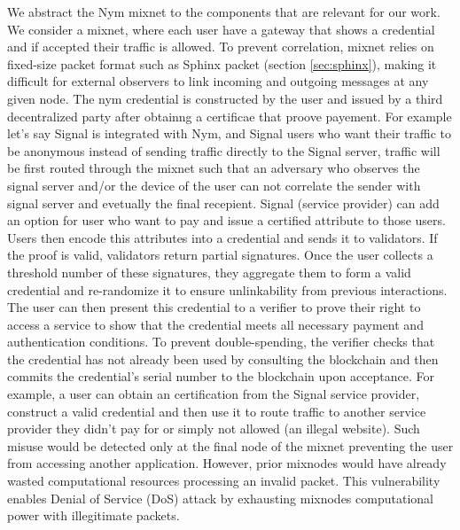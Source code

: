 %
%
We abstract the Nym mixnet to the components that are relevant for our
work. We consider a mixnet, where each user have a gateway that shows a
credential and if accepted their traffic is allowed.  To prevent
correlation, mixnet relies on fixed-size packet format such as Sphinx
packet (section \ref{sec:sphinx}), making it difficult for external
observers to link incoming and outgoing messages at any given node.  The
nym credential is constructed by the user and issued by a third
decentralized party after obtainng a certificae that proove payement.  For
example let's say Signal is integrated with Nym, and Signal users who want
their traffic to be anonymous instead of sending traffic directly to the
Signal server, traffic will be first routed through the mixnet such that an
adversary who observes the signal server and/or the device of the user can
not correlate the sender with signal server and evetually the final
recepient. Signal (service provider) can add an option for user who want to
pay and issue a certified attribute to those users. Users then encode this
attributes into a credential and sends it to validators. If the proof is
valid, validators return partial signatures. Once the user collects a
threshold number of these signatures, they aggregate them to form a valid
credential and re-randomize it to ensure unlinkability from previous
interactions. The user can then present this credential to a verifier to
prove their right to access a service to show that the credential meets all
necessary payment and authentication conditions. To prevent
double-spending, the verifier checks that the credential has not already
been used by consulting the blockchain and then commits the credential's
serial number to the blockchain upon acceptance.  For example, a user can
obtain an certification from the Signal service provider, construct a valid
credential and then use it to route traffic to another service provider
they didn't pay for or simply not allowed (an illegal website).  Such
misuse would be detected only at the final node of the mixnet preventing
the user from accessing another application.  However, prior mixnodes would
have already wasted computational resources processing an invalid packet.
This vulnerability enables Denial of Service (DoS) attack by exhausting
mixnodes computational power with illegitimate packets.

